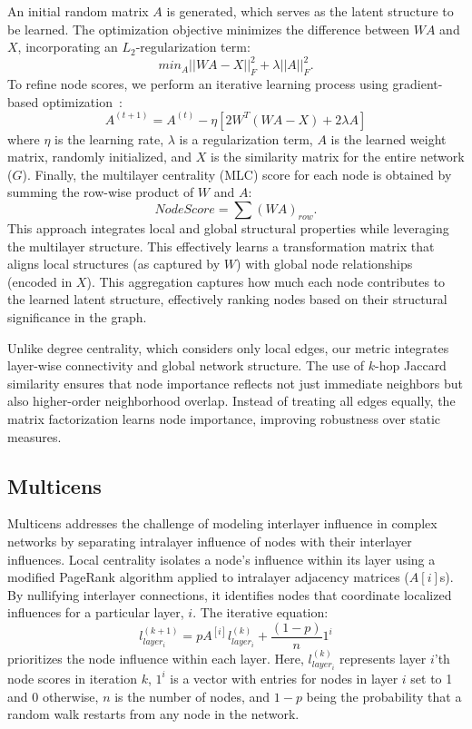 \documentclass[10pt,letterpaper]{article}
\begin{document}
An initial random matrix $A$ is generated, which serves as the latent structure to be learned. 
The optimization objective minimizes the difference between $WA$ and $X$, incorporating an $L_2$-regularization term:
\[
min_A ||WA-X||^{2}_{F} + \lambda||A||^{2}_{F}.
\]
To refine node scores, we perform an iterative learning process using gradient-based optimization~\cite{ruder2016graddes}:
\[
A^{(t+1)} = A^{(t)} - \eta[2W^T (WA - X) + 2\lambda A]
\]
where $\eta$ is the learning rate, $\lambda$ is a regularization term, $A$ is the learned weight matrix, randomly initialized, and $X$ is the similarity matrix for the entire network ($G$). 
Finally, the multilayer centrality (MLC) score for each node is obtained by summing the row-wise product of $W$ and $A$:
\[
Node Score = \sum (WA)_{row}.
\]
This approach integrates local and global structural properties while leveraging the multilayer structure. This effectively learns a transformation matrix that aligns local structures (as captured by $W$) with global node relationships (encoded in $X$).
This aggregation captures how much each node contributes to the learned latent structure, effectively ranking nodes based on their structural significance in the graph.

Unlike degree centrality, which considers only local edges, our metric integrates layer-wise connectivity and global network structure. The use of $k$-hop Jaccard similarity ensures that node importance reflects not just immediate neighbors but also higher-order neighborhood overlap. Instead of treating all edges equally, the matrix factorization learns node importance, improving robustness over static measures. 

\subsection*{Multicens~\cite{kumar2023multicens}}
Multicens addresses the challenge of modeling interlayer influence in complex networks by separating intralayer influence of nodes with their interlayer influences. Local centrality isolates a node’s influence within its layer using a modified PageRank algorithm applied to intralayer adjacency matrices ($A[i]$s). By nullifying interlayer connections, it identifies nodes that coordinate localized influences for a particular layer, $i$. The iterative equation:
\[
l_{layer_{i}}^{(k+1)}=pA^{[i]}l_{layer_{i}}^{(k)}+\frac{(1-p)}{n}1^{i}
\]
prioritizes the node influence within each layer. Here, $l_{layer_{i}}^{(k)}$ represents layer $i$'th node scores in iteration $k$, $1^{i}$ is a vector with entries for nodes in layer $i$ set to 1 and 0 otherwise, $n$ is the number of nodes, and $1-p$ being the probability that a random walk restarts from any node in the network. 
\end{document}
